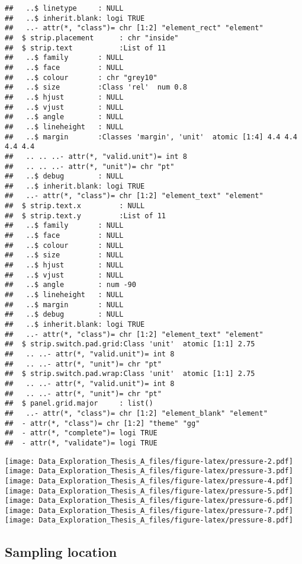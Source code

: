\documentclass[]{article}
\begin{document}
\begin{verbatim}
##   ..$ linetype     : NULL
##   ..$ inherit.blank: logi TRUE
##   ..- attr(*, "class")= chr [1:2] "element_rect" "element"
##  $ strip.placement      : chr "inside"
##  $ strip.text           :List of 11
##   ..$ family       : NULL
##   ..$ face         : NULL
##   ..$ colour       : chr "grey10"
##   ..$ size         :Class 'rel'  num 0.8
##   ..$ hjust        : NULL
##   ..$ vjust        : NULL
##   ..$ angle        : NULL
##   ..$ lineheight   : NULL
##   ..$ margin       :Classes 'margin', 'unit'  atomic [1:4] 4.4 4.4 4.4 4.4
##   .. .. ..- attr(*, "valid.unit")= int 8
##   .. .. ..- attr(*, "unit")= chr "pt"
##   ..$ debug        : NULL
##   ..$ inherit.blank: logi TRUE
##   ..- attr(*, "class")= chr [1:2] "element_text" "element"
##  $ strip.text.x         : NULL
##  $ strip.text.y         :List of 11
##   ..$ family       : NULL
##   ..$ face         : NULL
##   ..$ colour       : NULL
##   ..$ size         : NULL
##   ..$ hjust        : NULL
##   ..$ vjust        : NULL
##   ..$ angle        : num -90
##   ..$ lineheight   : NULL
##   ..$ margin       : NULL
##   ..$ debug        : NULL
##   ..$ inherit.blank: logi TRUE
##   ..- attr(*, "class")= chr [1:2] "element_text" "element"
##  $ strip.switch.pad.grid:Class 'unit'  atomic [1:1] 2.75
##   .. ..- attr(*, "valid.unit")= int 8
##   .. ..- attr(*, "unit")= chr "pt"
##  $ strip.switch.pad.wrap:Class 'unit'  atomic [1:1] 2.75
##   .. ..- attr(*, "valid.unit")= int 8
##   .. ..- attr(*, "unit")= chr "pt"
##  $ panel.grid.major     : list()
##   ..- attr(*, "class")= chr [1:2] "element_blank" "element"
##  - attr(*, "class")= chr [1:2] "theme" "gg"
##  - attr(*, "complete")= logi TRUE
##  - attr(*, "validate")= logi TRUE
\end{verbatim}

\texttt{[image: Data\_Exploration\_Thesis\_A\_files/figure-latex/pressure-2.pdf]}
\texttt{[image: Data\_Exploration\_Thesis\_A\_files/figure-latex/pressure-3.pdf]}
\texttt{[image: Data\_Exploration\_Thesis\_A\_files/figure-latex/pressure-4.pdf]}
\texttt{[image: Data\_Exploration\_Thesis\_A\_files/figure-latex/pressure-5.pdf]}
\texttt{[image: Data\_Exploration\_Thesis\_A\_files/figure-latex/pressure-6.pdf]}
\texttt{[image: Data\_Exploration\_Thesis\_A\_files/figure-latex/pressure-7.pdf]}
\texttt{[image: Data\_Exploration\_Thesis\_A\_files/figure-latex/pressure-8.pdf]}

\subsection{Sampling location}\label{sampling-location}
\end{document}
